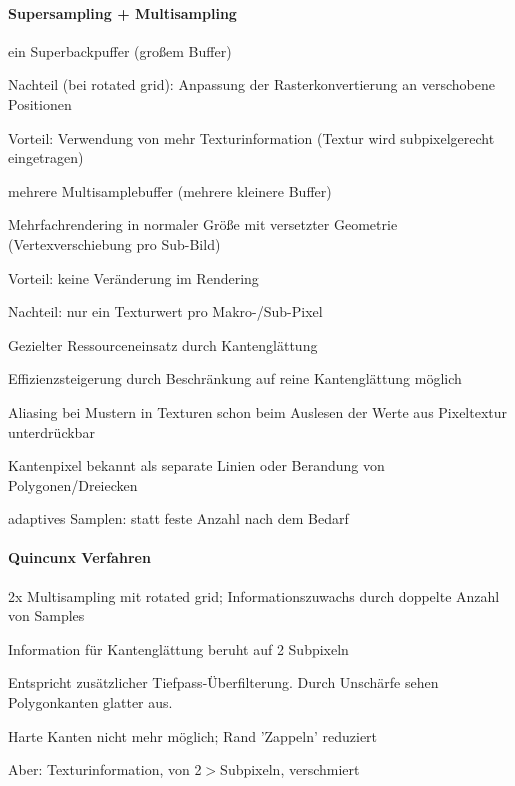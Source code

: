 \documentclass[landscape]{article}
\begin{document}
\begin{multicols}{3}
  \paragraph{Supersampling + Multisampling}
  \begin{itemize*}
    \item ein Superbackpuffer (großem Buffer)
    \begin{itemize*}
      \item Nachteil (bei rotated grid): Anpassung der Rasterkonvertierung an verschobene Positionen
      \item Vorteil: Verwendung von mehr Texturinformation (Textur wird subpixelgerecht eingetragen)
    \end{itemize*}
    \item mehrere Multisamplebuffer (mehrere kleinere Buffer)
    \begin{itemize*}
      \item Mehrfachrendering in normaler Größe mit versetzter Geometrie (Vertexverschiebung pro Sub-Bild)
      \item Vorteil: keine Veränderung im Rendering
      \item Nachteil: nur ein Texturwert pro Makro-/Sub-Pixel
    \end{itemize*}
    \item Gezielter Ressourceneinsatz durch Kantenglättung
    \begin{itemize*} 
      \item Effizienzsteigerung durch Beschränkung auf reine Kantenglättung möglich
      \item Aliasing bei Mustern in Texturen schon beim Auslesen der Werte aus Pixeltextur unterdrückbar
      \item Kantenpixel bekannt als separate Linien oder Berandung von Polygonen/Dreiecken
    \end{itemize*}
    \item adaptives Samplen: statt feste Anzahl nach dem Bedarf
  \end{itemize*}
  
  \paragraph{Quincunx Verfahren}
  \begin{itemize*}
    \item 2x Multisampling mit rotated grid; Informationszuwachs durch doppelte Anzahl von Samples
    \item Information für Kantenglättung beruht auf 2 Subpixeln
    \item Entspricht zusätzlicher Tiefpass-Überfilterung. Durch Unschärfe sehen Polygonkanten glatter aus.
    \item Harte Kanten nicht mehr möglich; Rand 'Zappeln' reduziert
    \item Aber: Texturinformation, von 2$>$Subpixeln, verschmiert
  \end{itemize*}
  

\end{multicols}
\end{document}
